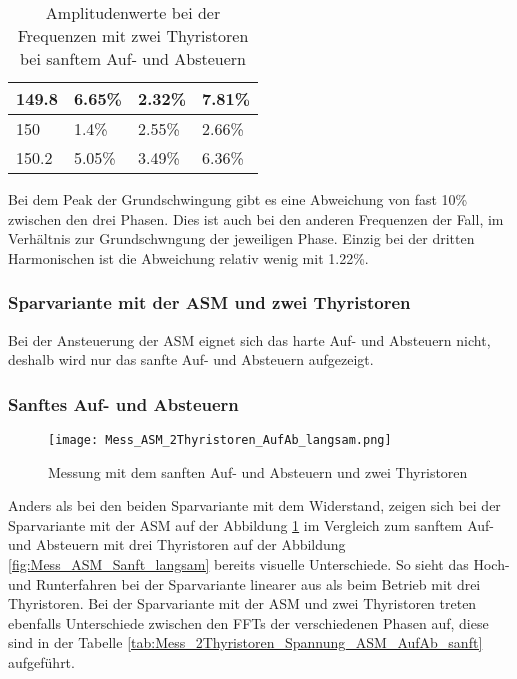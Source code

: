 \begin{table}[ht!]
\begin{tabular}{|l|l|l|l|}
		149.8             & 6.65\%                                                                              & 2.32\%                                                                              & 7.81\%                                                                              \\ \hline
		150               & 1.4\%                                                                               & 2.55\%                                                                              & 2.66\%                                                                              \\ \hline
		150.2             & 5.05\%                                                                              & 3.49\%                                                                              & 6.36\%                                                                              \\ \hline
	\end{tabular}
\caption{Amplitudenwerte bei der Frequenzen mit zwei Thyristoren bei sanftem Auf- und Absteuern}\label{tab:Mess_2Thyristoren_Spannung_Widerstand_AufAb_sanft}
\end{table}


Bei dem Peak der Grundschwingung gibt es eine Abweichung von fast 10\% zwischen den drei Phasen. Dies ist auch bei den anderen Frequenzen der Fall, im Verhältnis zur Grundschwngung der jeweiligen Phase. Einzig bei der dritten Harmonischen ist die Abweichung relativ wenig mit 1.22\%. 

\newpage
\subsubsection{Sparvariante mit der ASM und zwei Thyristoren}
Bei der Ansteuerung der ASM eignet sich das harte Auf- und Absteuern nicht, deshalb wird nur das sanfte Auf- und Absteuern aufgezeigt.
\subsubsection*{Sanftes Auf- und Absteuern}
\begin{figure}[ht!]
	\centering
	\texttt{[image: Mess\_ASM\_2Thyristoren\_AufAb\_langsam.png]}	
	\caption{Messung mit dem sanften Auf- und Absteuern und zwei Thyristoren}\label{fig:Mess_2Thyristoren_ASM_AufAbFahren_langsam}	
\end{figure}

Anders als bei den beiden Sparvariante mit dem Widerstand, zeigen sich bei der Sparvariante mit der ASM auf der Abbildung \ref{fig:Mess_2Thyristoren_ASM_AufAbFahren_langsam} im Vergleich zum sanftem Auf- und Absteuern mit drei Thyristoren auf der Abbildung \ref{fig:Mess_ASM_Sanft_langsam} bereits visuelle Unterschiede. So sieht das Hoch- und Runterfahren bei der Sparvariante linearer aus als beim Betrieb mit drei Thyristoren. Bei der Sparvariante mit der ASM und zwei Thyristoren treten ebenfalls Unterschiede zwischen den FFTs der verschiedenen Phasen auf, diese sind in der Tabelle \ref{tab:Mess_2Thyristoren_Spannung_ASM_AufAb_sanft} aufgeführt. 


